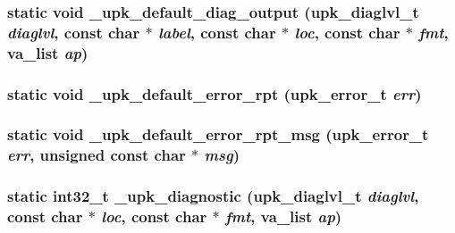 \subsubsection{\setlength{\rightskip}{0pt plus 5cm}static void \_\-upk\_\-default\_\-diag\_\-output (\bf{upk\_\-diaglvl\_\-t} {\em diaglvl}, const char $\ast$ {\em label}, const char $\ast$ {\em loc}, const char $\ast$ {\em fmt}, va\_\-list {\em ap})\hspace{0.3cm}{\tt  [static]}}\label{upk__error_8c_e49b8fec27fe4b0de87a74faecc74379}


\subsubsection{\setlength{\rightskip}{0pt plus 5cm}static void \_\-upk\_\-default\_\-error\_\-rpt (\bf{upk\_\-error\_\-t} {\em err})\hspace{0.3cm}{\tt  [static]}}\label{upk__error_8c_380f30cf48546faa395b180e2f51b648}


\subsubsection{\setlength{\rightskip}{0pt plus 5cm}static void \_\-upk\_\-default\_\-error\_\-rpt\_\-msg (\bf{upk\_\-error\_\-t} {\em err}, unsigned const char $\ast$ {\em msg})\hspace{0.3cm}{\tt  [static]}}\label{upk__error_8c_a2fd7caafb2808f07cd11f329918586e}


\subsubsection{\setlength{\rightskip}{0pt plus 5cm}static int32\_\-t \_\-upk\_\-diagnostic (\bf{upk\_\-diaglvl\_\-t} {\em diaglvl}, const char $\ast$ {\em loc}, const char $\ast$ {\em fmt}, va\_\-list {\em ap})\hspace{0.3cm}{\tt  [static]}}\label{upk__error_8c_f77cd0db84456a38833da3b7b27d3a84}




